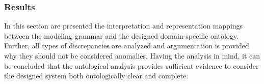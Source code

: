 \subsubsection{Results}

In this section are presented the interpretation and representation mappings
between the modeling grammar and the designed domain-specific ontology.
Further, all types of discrepancies are analyzed and argumentation is provided
why they should not be considered anomalies. Having the analysis in mind, it
can be concluded that the ontological analysis provides sufficient evidence to
consider the designed system both ontologically clear and complete.
